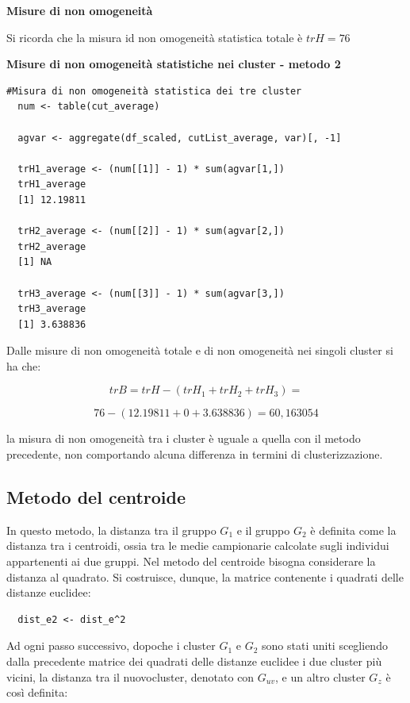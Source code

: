 \noindent \textbf{Misure di non omogeneità}

Si ricorda che la misura id non omogeneità statistica totale è $trH = 76$

\noindent \textbf{Misure di non omogeneità statistiche nei cluster - metodo 2}

\vspace{5mm}
\begin{lstlisting}
#Misura di non omogeneità statistica dei tre cluster
  num <- table(cut_average)

  agvar <- aggregate(df_scaled, cutList_average, var)[, -1]

  trH1_average <- (num[[1]] - 1) * sum(agvar[1,])
  trH1_average
  [1] 12.19811

  trH2_average <- (num[[2]] - 1) * sum(agvar[2,])
  trH2_average
  [1] NA

  trH3_average <- (num[[3]] - 1) * sum(agvar[3,])
  trH3_average
  [1] 3.638836
\end{lstlisting}
\vspace{5mm}

Dalle misure di non omogeneità totale e di non omogeneità nei singoli cluster si ha che:

\[trB = trH - (trH_1 + trH_2 + trH_3) = \]

\[76 - (12.19811 + 0 + 3.638836) = 60,163054\]

\noindent la misura di non omogeneità tra i cluster è uguale a quella con il metodo precedente, non comportando alcuna differenza in termini di clusterizzazione.

\subsection{Metodo del centroide}\label{cap5.2.4}

In questo metodo, la distanza tra il gruppo $G_1$ e il gruppo $G_2$ è definita come la distanza tra i centroidi, ossia tra le medie campionarie calcolate sugli individui appartenenti ai due gruppi. Nel metodo del centroide bisogna considerare la distanza al quadrato. Si costruisce, dunque, la matrice contenente i quadrati delle distanze euclidee:

\vspace{5mm}
\begin{lstlisting}
  dist_e2 <- dist_e^2
\end{lstlisting}
\vspace{5mm}

Ad ogni passo successivo, dopoche i cluster $G_1$ e $G_2$ sono stati uniti scegliendo dalla precedente matrice dei quadrati delle distanze euclidee i due cluster più vicini, la distanza tra il nuovocluster, denotato con $G_{uv}$, e un altro cluster $G_z$ è così definita:

